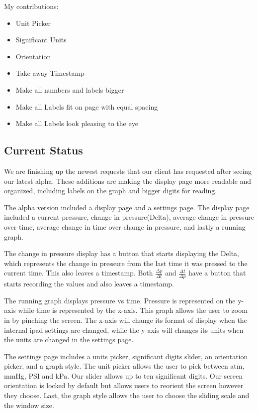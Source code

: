 \documentclass[onecolumn, draftclsnofoot,10pt, compsoc]{IEEEtran}
\begin{document}
My contributions:
\begin{itemize}
\item Unit Picker
\item Significant Units
\item Orientation
\item Take away Timestamp
\item Make all numbers and labels bigger
\item Make all Labels fit on page with equal spacing
\item Make all Labels look pleasing to the eye
\end{itemize}

\subsection{Current Status}
We are finishing up the newest requests that our client has requested after seeing our latest alpha.
These additions are making the display page more readable and organized, including labels on the graph and bigger digits for reading.

The alpha version included a display page and a settings page.
The display page included a current pressure, change in pressure(Delta), average change in pressure over time, average change in time over change in pressure, and lastly a running graph.

The change in pressure display has a button that starts displaying the Delta, which represents the change in pressure from the last time it was pressed to the current time.
This also leaves a timestamp.
Both $\frac{\Delta p}{\Delta t}$ and $\frac{\Delta t}{\Delta p}$ have a button that starts recording the values and also leaves a timestamp.

The running graph displays pressure vs time.
Pressure is represented on the y-axis while time is represented by the x-axis.
This graph allows the user to zoom in by pinching the screen.
The x-axis will change its format of display when the internal ipad settings are changed, while the y-axis will changes its units when the units are changed in the settings page.

The settings page includes a units picker, significant digits slider, an orientation picker, and a graph style.
The unit picker allows the user to pick between atm, mmHg, PSI and kPa.
Our slider allows up to ten significant digits.
Our screen orientation is locked by default but allows users to reorient the screen however they choose.
Last, the graph style allows the user to choose the sliding scale and the window size.
\end{document}
